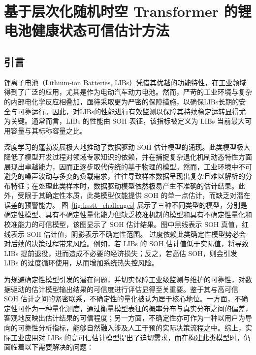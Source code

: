 \chapter{基于层次化随机时空 Transformer 的锂电池健康状态可信估计方法}\label{chap:HSSTT}

\section{引言}\label{sec:HSSTT_introduction}

锂离子电池（Lithium-ion Batteries, LIBs）凭借其优越的功能特性，在工业领域得到了广泛的应用，尤其是作为电动汽车动力电池\cite{NASAJPOURESFAHANI2024114783, hannan2017review}。然而，严苛的工业环境与复杂的内部电化学反应相叠加，亟待采取更为严密的保障措施，以确保LIBs长期的安全与可靠运行。因此，对LIBs的性能进行有效监测以保障其持续稳定运转显得尤为关键。通常而言，LIBs 的性能由 SOH 表征，该指标被定义为 LIBs 当前最大可用容量与其标称容量之比\cite{WANG2024110325, 10391265}。

深度学习的蓬勃发展极大地推动了数据驱动 SOH 估计模型的涌现。此类模型极大降低了模型开发过程对领域专家知识的依赖，并在捕捉复杂退化机制动态特性方面展现出卓越能力，因而正逐步取代传统的基于物理的模型\cite{mit_dataset_attia2020closed, tri_dataset_severson2019data, tongji_dataset_zhu2022data}。然而，工业环境中不可避免的噪声波动与多变的负载需求，往往导致样本数据呈现出复杂且难以解析的分布特征；在处理此类样本时，数据驱动模型依然极易产生不准确的估计结果\cite{10214203}。此外，受限于其确定性本质，此类模型仅能提供 SOH 的单一点估计，而缺乏对潜在误差的预警能力。
% 
图~\ref{fig:hsstt_challenges} 展示了三种不同类型的模型，分别是确定性模型、具有不确定性量化能力但缺乏校准机制的模型和具有不确定性量化和校准能力的可信模型，该图显示了 SOH 估计结果。图中黑线表示 SOH 真值，红线表示 SOH 估计值，阴影表示不确定性范围。
% 
过度依赖此类确定性模型势必会对后续的决策过程带来风险。例如，若 LIBs 的 SOH 估计值低于实际值，将导致 LIBs 提前退役，进而造成不必要的经济损失；反之，若高估 SOH，则会引发 LIBs 的过度循环使用，从而增加系统热失控风险。

为规避确定性模型引发的潜在问题，并切实保障工业级监测与维护的可靠性，对数据驱动的估计模型输出结果的可信度进行评估显得至关重要。鉴于其与高可信 SOH 估计之间的紧密联系，不确定性的量化被认为居于核心地位\cite{THUY2024330, 10539360}。一方面，不确定性可作为一种量化测度，通过衡量模型表征的概率分布与真实分布之间的偏差，客观地反映出估计结果的可信程度；另一方面，不确定性亦可作为一种以用户为导向的可靠性分析指标，能够自然融入涉及人工干预的实际决策流程之中。综上，实际工业应用对 LIBs 的高可信估计模型提出了迫切需求，而在构建此类模型时，仍面临着以下需要解决的问题：

